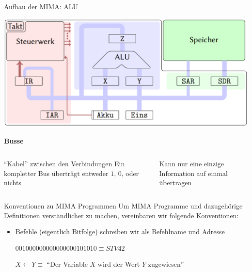 \begin{frame}{Aufbau der MIMA: ALU}
\begin{center}\includegraphics[width=.6\textwidth]{images/mima_aufbau.png}\end{center}

\bp

\textbf{Busse}

\begin{columns}
	\begin{column}{0.5\textwidth}
		\begin{itemize}
			\pitem ``Kabel'' zwischen den Verbindungen
			\pitem Ein kompletter Bus überträgt entweder $1$, $0$, oder nichts
		\end{itemize}
	\end{column}
	
	\begin{column}{0.5\textwidth}
		\begin{itemize}
			\pitem Kann nur eine einzige Information auf einmal übertragen
		\end{itemize}
	\end{column}
\end{columns}

\end{frame}

\begin{frame}{Konventionen zu MIMA Programmen}
	Um MIMA Programme und dazugehörige Definitionen verständlicher zu machen, vereinbaren wir folgende Konventionen:
	
	\bp
	
	\begin{itemize}
		\item Befehle (eigentlich Bitfolge) schreiben wir als Befehlname und Adresse
		\begin{itemize}
			\pitem $001000000000000000101010 \equiv STV 42$
		\end{itemize}
		\pitem $X \leftarrow Y \equiv $ ``Der Variable $X$ wird der Wert $Y$ zugewiesen''
		
	\end{itemize}
	
	
\end{frame}

